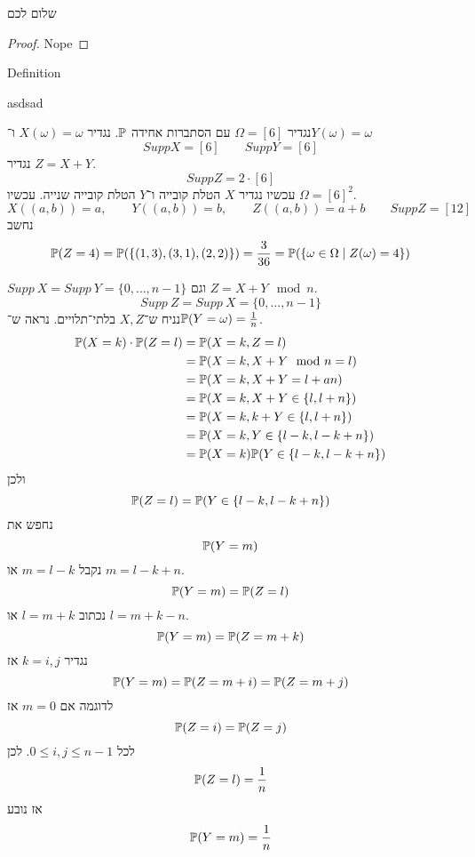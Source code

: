 

\usepackage{ifthen}



\question{}
\subquestion{}
\begin{theorem}
	שלום לכם
\end{theorem}
\begin{proof}
	Nope
\end{proof}
\begin{definition}
	Definition
\end{definition}
\begin{solution}
	asdsad
\end{solution}
נגדיר $\Omega = [6]$ עם הסתברות אחידה $\mathbb{P}$.
נגדיר $X(\omega) = \omega$ ו־$Y(\omega) = \omega$
\[
	Supp X = [6]
	\qquad
	Supp Y = [6]
\]
נגדיר $Z = X + Y$.
\[
	Supp Z = 2 \cdot [6]
\]
עכשיו נגדיר $X$ הטלת קובייה ו־$Y$ הטלת קובייה שנייה. עכשיו $\Omega = {[6]}^2$.
\[
	X((a, b)) = a,
	\qquad
	Y((a, b)) = b,
	\qquad
	Z((a, b)) = a + b
	\qquad
	Supp Z = [12]
\]
נחשב
\[
	\mathbb{P}(Z = 4) = \mathbb{P}(\{(1, 3), (3, 1), (2, 2)\}) = \frac{3}{36}
	= \mathbb{P}(\{\omega \in \Omega \mid Z(\omega) = 4\})
\]

$Supp\ X = Supp\ Y = \{0, \dots, n - 1\}$ וגם $Z = X + Y \mod n$.
\[
	Supp\ Z = Supp\ X = \{0, \dots, n - 1\}
\]
נניח ש־$X, Z$ בלתי־תלויים. נראה ש־$\mathbb{P}(Y = \omega) = \frac{1}{n}$.
\begin{align*}
	\mathbb{P}(X = k) \cdot \mathbb{P}(Z = l)
	& = \mathbb{P}(X = k, Z = l) \\
	& = \mathbb{P}(X = k, X + Y \mod n = l) \\
	& = \mathbb{P}(X = k, X + Y = l + a n) \\
	& = \mathbb{P}(X = k, X + Y \in \{l, l + n\}) \\
	& = \mathbb{P}(X = k, k + Y \in \{l, l + n\}) \\
	& = \mathbb{P}(X = k, Y \in \{l - k, l - k + n\}) \\
	& = \mathbb{P}(X = k) \mathbb{P}(Y \in \{l - k, l - k + n\}) \\
\end{align*}
ולכן
\[
	\mathbb{P}(Z = l) = \mathbb{P}(Y \in \{l - k, l - k + n\})
\]
נחפש את
\[
	\mathbb{P}(Y = m)
\]
נקבל $m = l - k$ או $m = l - k + n$.
\[
	\mathbb{P}(Y = m) = \mathbb{P}(Z = l)
\]
נכתוב $l = m + k$ או $l = m + k - n$.
\[
	\mathbb{P}(Y = m) = \mathbb{P}(Z = m + k)
\]
נגדיר $k = i, j$
אז
\[
	\mathbb{P}(Y = m) = \mathbb{P}(Z = m + i) = \mathbb{P}(Z = m + j)
\]
לדוגמה אם $m = 0$ אז
\[
	\mathbb{P}(Z = i) = \mathbb{P}(Z = j)
\]
לכל $0 \le i, j \le n - 1$.
לכן
\[
	\mathbb{P}(Z = l) = \frac{1}{n}
\]
אז נובע
\[
	\mathbb{P}(Y = m) = \frac{1}{n}
\]


